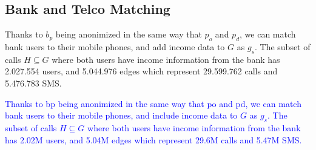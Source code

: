 \subsection{Bank and Telco Matching}

Thanks to \( b_p \) being anonimized in the same way that \( p_o \) and \( p_d \), we can match bank users to their mobile phones, and add income data to \( G \) as \( g_s \). The subset of calls \( H \subseteq G \) where both users have income information from the bank has \num{2,027,554} users, and \num{5,044,976} edges which represent \num{29,599,762} calls and \num{5,476,783} SMS.

\textcolor{blue}{Thanks to bp being anonimized in the same way that po and pd, we can match bank users to their mobile phones, and include income data to \( G \) as \( g_s \). The subset of calls \( H \subseteq G \) where both users have income information from the bank has 2.02M users, and 5.04M edges which represent 29.6M calls and 5.47M SMS.}